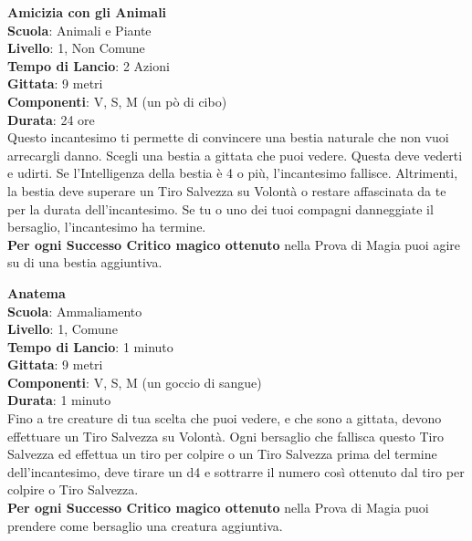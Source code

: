 \begin{multicols}{2}
\medskip\textbf{Amicizia con gli Animali}\\
\textbf{Scuola}: Animali e Piante\\
\textbf{Livello}: 1, Non Comune\\
\textbf{Tempo di Lancio}: 2 Azioni\\
\textbf{Gittata}: 9 metri\\
\textbf{Componenti}: V, S, M (un pò di cibo)\\
\textbf{Durata}: 24 ore\\
Questo incantesimo ti permette di convincere una bestia naturale che non vuoi arrecargli danno. Scegli una bestia a gittata che puoi vedere. Questa deve vederti e udirti. Se l'Intelligenza della bestia è 4 o più, l'incantesimo fallisce. Altrimenti, la bestia deve superare un Tiro Salvezza su Volontà o restare affascinata da te per la durata dell'incantesimo. Se tu o uno dei tuoi compagni danneggiate il bersaglio, l'incantesimo ha termine.\\
\textbf{Per ogni Successo Critico magico ottenuto} nella Prova di Magia puoi agire su di una bestia aggiuntiva.

\medskip\textbf{Anatema}\\
\textbf{Scuola}: Ammaliamento\\
\textbf{Livello}: 1, Comune\\
\textbf{Tempo di Lancio}: 1 minuto\\
\textbf{Gittata}: 9 metri\\
\textbf{Componenti}: V, S, M (un goccio di sangue)\\
\textbf{Durata}: 1 minuto\\
Fino a tre creature di tua scelta che puoi vedere, e che sono a gittata, devono effettuare un Tiro Salvezza su Volontà. Ogni bersaglio che fallisca questo Tiro Salvezza ed effettua un tiro per colpire o un Tiro Salvezza prima del termine dell'incantesimo, deve tirare un d4 e sottrarre il numero così ottenuto dal tiro per colpire o Tiro Salvezza.\\
\textbf{Per ogni Successo Critico magico ottenuto} nella Prova di Magia puoi prendere come bersaglio una creatura aggiuntiva.


\end{multicols}
